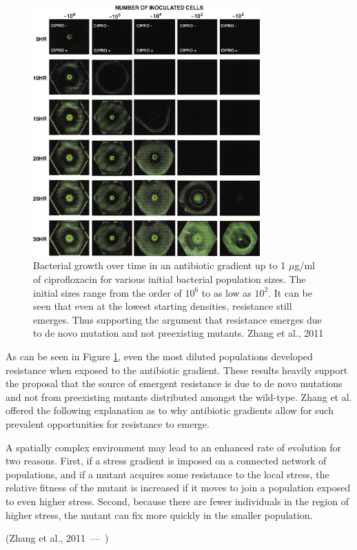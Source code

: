 \documentclass[a4paper,12pt]{article}
\let\oldquote\quote
\let\endoldquote\endquote
\renewenvironment{quote}[2][]
  {\if\relax\detokenize{#1}\relax
     \def\quoteauthor{#2}%
   \else
     \def\quoteauthor{#2~---~#1}%
   \fi
   \oldquote}
  {\par\nobreak\smallskip\hfill(\quoteauthor)%
   \endoldquote\addvspace{\bigskipamount}}
\begin{document}
\begin{figure}[h]
 \centering
 \includegraphics[height=9.6cm]{F2-large}
 \caption{Bacterial growth over time in an antibiotic gradient up to 1 $\mu$g/ml of ciprofloxacin for various initial bacterial population sizes.  
 The initial sizes range from the order of $10^6$ to as low as $10^2$.  It can be seen that even at the lowest starting densities, resistance still emerges.
 Thus supporting the argument that resistance emerges due to de novo mutation and not preexisting mutants.  Zhang et al., 2011}
 \label{fig:Zhang-gradient-inital-pop-sizes}
\end{figure}


As can be seen in Figure \ref{fig:Zhang-gradient-inital-pop-sizes}, even the most diluted populations developed resistance when exposed to the antibiotic gradient.  
These results heavily support the proposal that the source of emergent resistance is due to de novo mutations and not from preexisting mutants distributed amongst the 
wild-type.  Zhang et al. offered the following explanation as to why antibiotic gradients allow for such prevalent opportunities for resistance to emerge. 

\begin{quote}{Zhang et al., 2011}
 A spatially complex environment may lead to an enhanced rate of evolution for two reasons.  First, if a stress gradient is imposed on a connected network of 
 populations, and if a mutant acquires some resistance to the local stress, the relative fitness of the mutant is increased if it moves to join a population
 exposed to even higher stress.  Second, because there are fewer individuals in the region of higher stress, the mutant can fix more quickly in the smaller
 population.
\end{quote}
\end{document}
